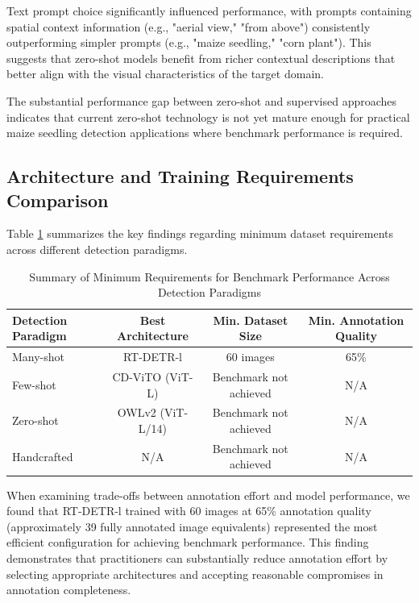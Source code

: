 \documentclass{article}
\begin{document}
Text prompt choice significantly influenced performance, with prompts containing spatial context information (e.g., "aerial view," "from above") consistently outperforming simpler prompts (e.g., "maize seedling," "corn plant"). This suggests that zero-shot models benefit from richer contextual descriptions that better align with the visual characteristics of the target domain.

The substantial performance gap between zero-shot and supervised approaches indicates that current zero-shot technology is not yet mature enough for practical maize seedling detection applications where benchmark performance is required.

\subsection{Architecture and Training Requirements Comparison}

Table \ref{tab:model_comparison} summarizes the key findings regarding minimum dataset requirements across different detection paradigms.

\begin{table}[h]
\caption{Summary of Minimum Requirements for Benchmark Performance Across Detection Paradigms}
\label{tab:model_comparison}
\centering
\begin{tabular}{lccc}
\hline
\textbf{Detection Paradigm} & \textbf{Best Architecture} & \textbf{Min. Dataset Size} & \textbf{Min. Annotation Quality} \\
\hline
Many-shot & RT-DETR-l & 60 images & 65\% \\
Few-shot & CD-ViTO (ViT-L) & Benchmark not achieved & N/A \\
Zero-shot & OWLv2 (ViT-L/14) & Benchmark not achieved & N/A \\
Handcrafted & N/A & Benchmark not achieved & N/A \\
\hline
\end{tabular}
\end{table}

When examining trade-offs between annotation effort and model performance, we found that RT-DETR-l trained with 60 images at 65\% annotation quality (approximately 39 fully annotated image equivalents) represented the most efficient configuration for achieving benchmark performance. This finding demonstrates that practitioners can substantially reduce annotation effort by selecting appropriate architectures and accepting reasonable compromises in annotation completeness.
\end{document}
